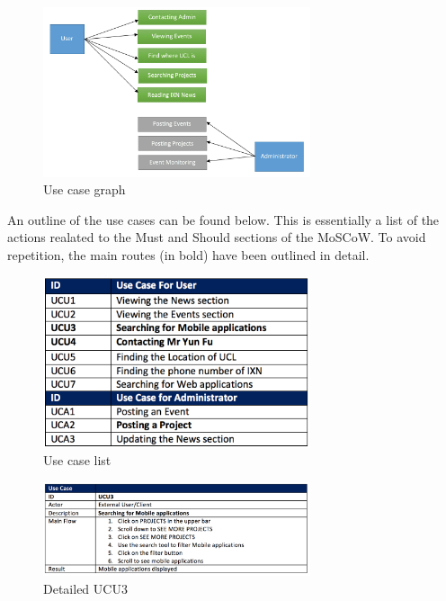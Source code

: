 \documentclass[fontsize=10pt]{extarticle}
\numberwithin{figure}{section} %
\begin{document}
\begin{figure}[H]
      \centering
      \includegraphics[trim = 0 0 0 0, clip, width=0.7\textwidth]{ph9.png}
      \caption{Use case graph}
\end{figure}

An outline of the use cases can be found below. This is essentially a
list of the actions realated to the Must and Should sections of the
MoSCoW. To avoid repetition, the main routes (in bold) have been
outlined in detail.

\begin{figure}[H]
      \centering
      \includegraphics[trim = 0 0 0 0, clip, width=0.7\textwidth]{ph10.png}
      \caption{Use case list}
 \end{figure}

\begin{figure}[H]
      \centering
      \includegraphics[trim = 0 0 0 0, clip, width=0.7\textwidth]{ph12.png}
      \caption{Detailed UCU3}
 \end{figure}
\end{document}
